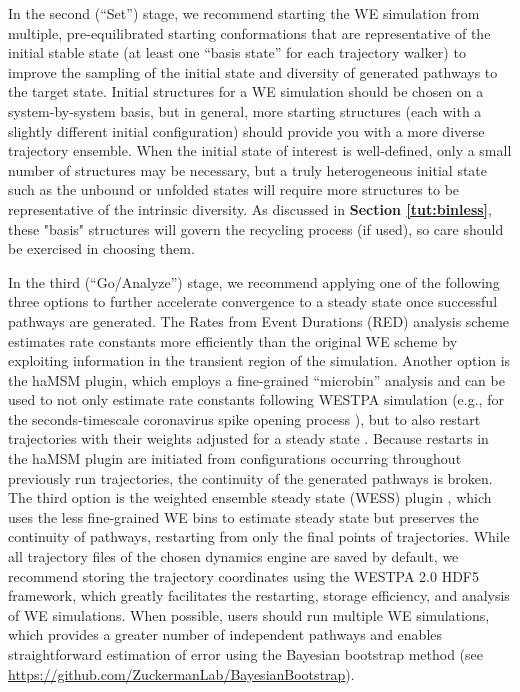 In the second (“Set”) stage, we recommend starting the WE simulation from multiple, pre-equilibrated starting conformations that are representative of the initial stable state (at least one “basis state” for each trajectory walker) to improve the sampling of the initial state and diversity of generated pathways to the target state. 
Initial structures for a WE simulation should be chosen on a system-by-system basis, but in general, more starting structures (each with a slightly different initial configuration) should provide you with a more diverse trajectory ensemble. 
When the initial state of interest is well-defined, only a small number of structures may be necessary, but a truly heterogeneous initial state such as the unbound or unfolded states will require more structures to be representative of the intrinsic diversity.  
As discussed in \textbf{Section \ref{tut:binless}}, these "basis" structures will govern the recycling process (if used), so care should be exercised in choosing them.

In the third (“Go/Analyze”) stage, we recommend applying one of the following three options to further accelerate convergence to a steady state once successful pathways are generated. 
The Rates from Event Durations (RED) analysis scheme \citep{degrave_red_2021} estimates rate constants more efficiently than the original WE scheme \citep{huber_weighted-ensemble_1996} by exploiting information in the transient region of the simulation.
Another option is the haMSM plugin, which employs a fine-grained “microbin” analysis and can be used to not only estimate rate constants following WESTPA simulation (e.g., for the seconds-timescale coronavirus spike opening process \citep{casalino_ai-driven_2021}), but to also restart trajectories with their weights adjusted for a steady state \citep{russo_westpa_2022}. 
Because restarts in the haMSM plugin are initiated from configurations occurring throughout previously run trajectories, the continuity of the generated pathways is broken. 
The third option is the weighted ensemble steady state (WESS) plugin \citep{bhatt_steady-state_2010}, which uses the less fine-grained WE bins to estimate steady state but preserves the continuity of pathways, restarting from only the final points of trajectories. 
While all trajectory files of the chosen dynamics engine are saved by default, we recommend storing the trajectory coordinates using the WESTPA 2.0 HDF5 framework, which greatly facilitates the restarting, storage efficiency, and analysis of WE simulations. 
When possible, users should run multiple WE simulations, which provides a greater number of independent pathways and enables straightforward estimation of error using the Bayesian bootstrap method \citep{mostofian_statistical_2019} (see {\url{https://github.com/ZuckermanLab/BayesianBootstrap}}).  

